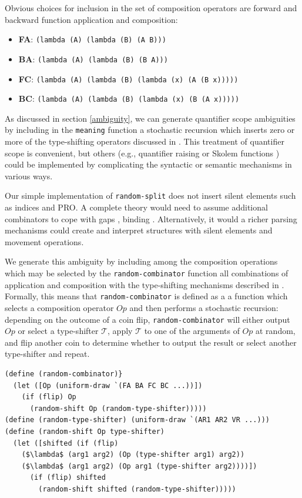 \documentclass[pdfextras]{handbook}
\begin{document}
Obvious choices for inclusion in the set of composition operators are forward and backward function application and composition:
\begin{itemize}
\item \textbf{FA}: \lstinline{(lambda (A) (lambda (B) (A B)))}
\item \textbf{BA}: \lstinline{(lambda (A) (lambda (B) (B A)))}
\item \textbf{FC}: \lstinline{(lambda (A) (lambda (B) (lambda (x) (A (B x)))))}
\item \textbf{BC}: \lstinline{(lambda (A) (lambda (B) (lambda (x) (B (A x)))))}
\end{itemize}
As discussed in section \ref{ambiguity}, we can generate quantifier scope ambiguities by including in the \lstinline{meaning} function a stochastic recursion which inserts zero or more of the type-shifting operators discussed in \citet{hendriks93}. 
This treatment of quantifier scope is convenient, but others (e.g., quantifier raising \citep{may77} or Skolem functions \cite{steedman12}) could be implemented by complicating the syntactic or semantic mechanisms in various ways. 

Our simple implementation of \lstinline{random-split} does not insert silent elements such as indices and PRO. 
A complete theory would need to assume additional combinators to cope with gaps \citep{steedman00}, binding \citep{jacobson99,barker05}. 
Alternatively, it would a richer parsing mechanisms could create and interpret structures with silent elements and movement operations.

We generate this ambiguity by including among the composition operations which may be selected by the \lstinline{random-combinator} function all combinations of application and composition with the type-shifting mechanisms described in \citet{hendriks93,barker05}.
Formally, this means that \lstinline{random-combinator} is defined as a a function which selects a composition operator $\mathit{Op}$ and then performs a stochastic recursion: depending on the outcome of a coin flip, \lstinline{random-combinator} will either output $\mathit{Op}$ or select a type-shifter $\mathcal{T}$, apply $\mathcal{T}$ to one of the arguments of $\mathit{Op}$ at random, and flip another coin to determine whether to output the result or select another type-shifter and repeat.
\begin{lstlisting}[mathescape]
(define (random-combinator)}
  (let ([Op (uniform-draw `(FA BA FC BC ...))])
    (if (flip) Op
      (random-shift Op (random-type-shifter)))))
(define (random-type-shifter) (uniform-draw `(AR1 AR2 VR ...)))
(define (random-shift Op type-shifter)
  (let ([shifted (if (flip)
    ($\lambda$ (arg1 arg2) (Op (type-shifter arg1) arg2))
    ($\lambda$ (arg1 arg2) (Op arg1 (type-shifter arg2))))])
      (if (flip) shifted
        (random-shift shifted (random-type-shifter)))))
\end{lstlisting}
\end{document}
